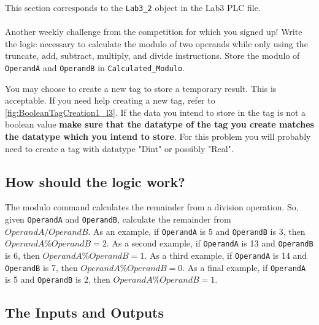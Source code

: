 This section corresponds to the \verb|Lab3_2| object in the Lab3 PLC file.
\\ 
\\
Another weekly challenge from the competition for which you signed up! Write the logic necessary to calculate the modulo of two operands while only using the truncate, add, subtract, multiply, and divide instructions. Store the modulo of \verb|OperandA| and \verb|OperandB| in \verb|Calculated_Modulo|.

You may choose to create a new tag to store a temporary result. This is acceptable. If you need help creating a new tag, refer to \figureautorefname \ref{fig:BooleanTagCreation1_l3}. If the data you intend to store in the tag is not a boolean value \textbf{make sure that the datatype of the tag you create matches the datatype which you intend to store}. For this problem you will probably need to create a tag with datatype "Dint" or possibly "Real".



\subsection{How should the logic work?}

The modulo command calculates the remainder from a division operation. So, given \verb|OperandA| and \verb|OperandB|, calculate the remainder from $OperandA/OperandB$. As an example, if \verb|OperandA| is 5 and \verb|OperandB| is 3, then $OperandA \% OperandB = 2$. As a second example, if \verb|OperandA| is 13 and \verb|OperandB| is 6, then $OperandA \% OperandB = 1$. As a third example, if \verb|OperandA| is 14 and \verb|OperandB| is 7, then $OperandA \% OperandB = 0$. As a final example, if \verb|OperandA| is 5 and \verb|OperandB| is 2, then $OperandA \% OperandB = 1$. 


\subsection{The Inputs and Outputs}

